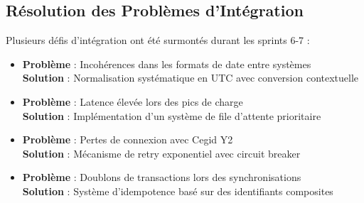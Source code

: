 \subsection{Résolution des Problèmes d'Intégration}

\begin{mdframed}[backgroundcolor=lightgreen!20, linewidth=1pt]
Plusieurs défis d'intégration ont été surmontés durant les sprints 6-7 :

\begin{itemize}
    \item \textbf{Problème} : Incohérences dans les formats de date entre systèmes\\
      \textbf{Solution} : Normalisation systématique en UTC avec conversion contextuelle
    \item \textbf{Problème} : Latence élevée lors des pics de charge\\
      \textbf{Solution} : Implémentation d'un système de file d'attente prioritaire
    \item \textbf{Problème} : Pertes de connexion avec Cegid Y2\\
      \textbf{Solution} : Mécanisme de retry exponentiel avec circuit breaker
    \item \textbf{Problème} : Doublons de transactions lors des synchronisations\\
      \textbf{Solution} : Système d'idempotence basé sur des identifiants composites
\end{itemize}
\end{mdframed}
